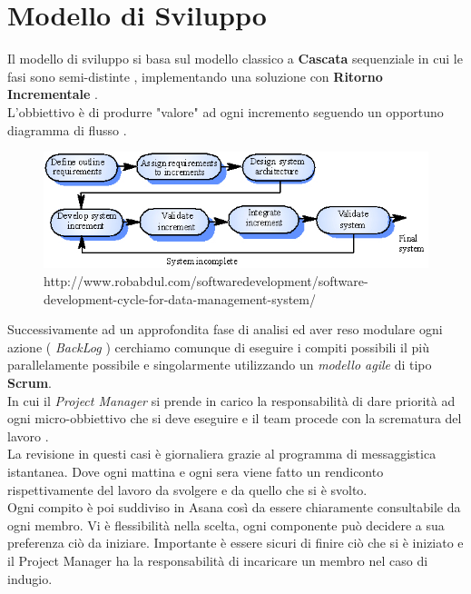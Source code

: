 \documentclass[12pt,a4paper,titlepage]{article}
\begin{document}
	\newpage
	
	\section{Modello di Sviluppo}
	Il modello di sviluppo si basa sul modello classico a \textbf{Cascata} sequenziale in cui le fasi sono semi-distinte , implementando una soluzione con \textbf{Ritorno Incrementale} . \\
	L'obbiettivo è di produrre "valore" ad ogni incremento seguendo un opportuno diagramma di flusso .\\
	
	\begin{figure}
		\centering
		\includegraphics[width=0.7\linewidth]{Incremental-Development}
		\caption[Incremental Development]{http://www.robabdul.com/softwaredevelopment/software-development-cycle-for-data-management-system/}
		\label{fig:incremental-development}
	\end{figure}
	
	Successivamente ad un approfondita fase di analisi ed aver reso modulare ogni azione ( \textit{BackLog} ) cerchiamo comunque di eseguire i compiti possibili il più parallelamente possibile e singolarmente utilizzando un \textit{modello agile} di tipo \textbf{Scrum}.\\
	In cui il \textit{Project Manager} si prende in carico la responsabilità di dare priorità ad ogni micro-obbiettivo che si deve eseguire e il team procede con la scrematura del lavoro . \\
	La revisione in questi casi è giornaliera grazie al programma di messaggistica istantanea. Dove ogni mattina e ogni sera viene fatto un rendiconto rispettivamente del lavoro da svolgere e da quello che si è svolto.\\
	Ogni compito è poi suddiviso in Asana così da essere chiaramente consultabile da ogni membro. Vi è flessibilità nella scelta, ogni componente può decidere a sua preferenza ciò da iniziare. Importante è essere sicuri di finire ciò che si è iniziato e il Project Manager ha la responsabilità di incaricare un membro nel caso di indugio.
	
	
\end{document}
